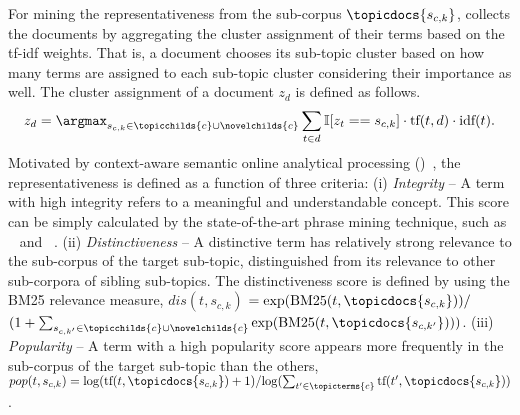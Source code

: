 For mining the representativeness from the sub-corpus $\topicdocs{s_{c,k}}$, \proposed collects the documents by aggregating the cluster assignment of their terms based on the tf-idf weights.
That is, a document chooses its sub-topic cluster based on how many terms are assigned to each sub-topic cluster considering their importance as well.
The cluster assignment of a document $z_d$ is defined as follows.
\begin{equation}
\label{eq:docassign}
    z_d = \argmax_{s_{c,k}\in\topicchilds{c}\cup\novelchilds{c}} \sum_{t\in d} \mathbb{I}[z_t==s_{c,k}]\cdot \text{tf}(t, d) \cdot \text{idf}(t).
\end{equation}
%
Motivated by context-aware semantic online analytical processing (\caseolap)~\cite{tao2016multi},
the representativeness is defined as a function of three criteria:
(i) \textit{Integrity} -- A term with high integrity refers to a meaningful and understandable concept.
This score can be simply calculated by the state-of-the-art phrase mining technique, such as \segphrase~\cite{liu2015mining} and \autophrase~\cite{shang2018automated}.
(ii) \textit{Distinctiveness} -- A distinctive term has relatively strong relevance to the sub-corpus of the target sub-topic, distinguished from its relevance to other sub-corpora of sibling sub-topics.
The distinctiveness score is defined by using the BM25 relevance measure,
$dis(t, s_{c,k})$ $={\exp (\text{BM25}(t, \topicdocs{s_{c,k}}))}/$ ${(1 + \sum_{s_{c,k'}\in\topicchilds{c}\cup\novelchilds{c}}\exp (\text{BM25}(t, \topicdocs{s_{c,k'}})))}$.
(iii) \textit{Popularity} -- A term with a high popularity score appears more frequently in the sub-corpus of the target sub-topic than the others, $pop(t, s_{c,k}) = {\log ( \text{tf}(t, \topicdocs{s_{c,k}}) + 1)}/{\log (\sum_{t'\in\topicterms{c}}\text{tf}(t', \topicdocs{s_{c,k}}))}$.

